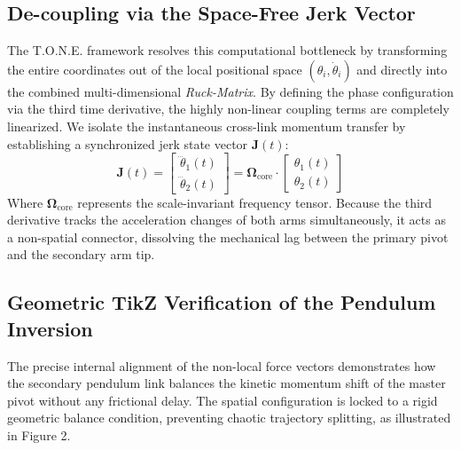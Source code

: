 \documentclass[11pt,a4paper]{article}
\begin{document}
\subsection{De-coupling via the Space-Free Jerk Vector}
The T.O.N.E. framework resolves this computational bottleneck by transforming the entire coordinates out of the local positional space $(\theta_i, \dot{\theta}_i)$ and directly into the combined multi-dimensional \textit{Ruck-Matrix}. By defining the phase configuration via the third time derivative, the highly non-linear coupling terms are completely linearized. We isolate the instantaneous cross-link momentum transfer by establishing a synchronized jerk state vector $\mathbf{J}(t)$:
\begin{equation}
    \mathbf{J}(t) = \begin{bmatrix} \dddot{\theta}_1(t) \\ \dddot{\theta}_2(t) \end{bmatrix} = \mathbf{\Omega}_{\text{core}} \cdot \begin{bmatrix} \theta_1(t) \\ \theta_2(t) \end{bmatrix}
    \label{eq:jerk_matrix}
\end{equation}
Where $\mathbf{\Omega}_{\text{core}}$ represents the scale-invariant frequency tensor. Because the third derivative tracks the acceleration changes of both arms simultaneously, it acts as a non-spatial connector, dissolving the mechanical lag between the primary pivot and the secondary arm tip.

\subsection{Geometric TikZ Verification of the Pendulum Inversion}
The precise internal alignment of the non-local force vectors demonstrates how the secondary pendulum link balances the kinetic momentum shift of the master pivot without any frictional delay. The spatial configuration is locked to a rigid geometric balance condition, preventing chaotic trajectory splitting, as illustrated in Figure 2.
\end{document}
